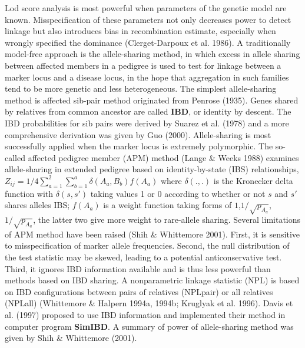Lod score analysis is most powerful when parameters of the genetic model are
known.  Misspecification of these parameters not only decreases power to detect
linkage but also introduces bias in recombination estimate, especially when
wrongly specified the dominance (Clerget-Darpoux et al.  1986).  A
traditionally model-free approach is the allele-sharing method, in which excess
in allele sharing between affected members in a pedigree is used to test for
linkage between a marker locus and a disease locus, in the hope that
aggregation in such families tend to be more genetic and less heterogeneous.
The simplest allele-sharing method is affected sib-pair method originated from
Penrose (1935).  Genes shared by relatives from common ancestor are called {\bf
IBD}, or identity by descent.  The IBD probabilities for sib pairs were derived
by Suarez et al.  (1978) and a more comprehensive derivation was given by Guo
(2000).  Allele-sharing is most successfully applied when the marker locus is
extremely polymorphic.  The so-called affected pedigree member (APM) method
(Lange \& Weeks 1988) examines allele-sharing in extended pedigree based on
identity-by-state (IBS) relationships, $Z_{ij} =
{1/4}\sum^2_{a=1}\sum^a_{b=1}\delta(A_a,B_b)f(A_a)$ where $\delta(.,.)$ is the
Kronecker delta function with $\delta(s,s')$ taking values 1 or 0 according to
whether or not $s$ and $s'$ shares alleles IBS; $f(A_a)$ is a weight function
taking forms of $1$,$1/\sqrt{p_{A_a}}$, $1/\sqrt{p_{A_a}}$, the latter two give
more weight to rare-allele sharing.  Several limitations of APM method have
been raised (Shih \& Whittemore 2001).  First, it is sensitive to
misspecification of marker allele frequencies.  Second, the null distribution
of the test statistic may be skewed, leading to a potential anticonservative
test.  Third, it ignores IBD information available and is thus less powerful
than methods based on IBD sharing.  A nonparametric linkage statistic (NPL) is
based on IBD configurations between pairs of relatives (NPLpair) or all
relatives (NPLall) (Whittemore \& Halpern 1994a, 1994b; Kruglyak et al.  1996).
Davis et al.  (1997) proposed to use IBD information and implemented their
method in computer program {\bf SimIBD}.  A summary of power of allele-sharing
method was given by Shih \& Whittemore (2001).

